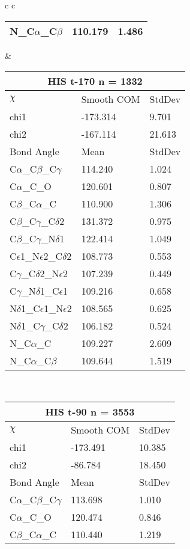 \begin{longtable}{ c c }
\begin{tabular}{ l l l }
  N\_C$\alpha$\_C$\beta$ & 110.179 & 1.486\\
  \bottomrule
  \end{tabular}
  &
  \begin{tabular}{ l l l }
  \toprule
  \multicolumn{3}{c}{HIS \textbf{t-170} n = 1332} \\ \toprule
  $\chi$       & Smooth COM & StdDev \\ \midrule
  chi1 & -173.314 & 9.701 \\ 
  chi2 & -167.114 & 21.613 \\ \midrule
  Bond Angle   & Mean     & StdDev \\ \midrule
  C$\alpha$\_C$\beta$\_C$\gamma$ & 114.240 & 1.024\\
  C$\alpha$\_C\_O & 120.601 & 0.807\\
  C$\beta$\_C$\alpha$\_C & 110.900 & 1.306\\
  C$\beta$\_C$\gamma$\_C$\delta$2 & 131.372 & 0.975\\
  C$\beta$\_C$\gamma$\_N$\delta$1 & 122.414 & 1.049\\
  C$\epsilon$1\_N$\epsilon$2\_C$\delta$2 & 108.773 & 0.553\\
  C$\gamma$\_C$\delta$2\_N$\epsilon$2 & 107.239 & 0.449\\
  C$\gamma$\_N$\delta$1\_C$\epsilon$1 & 109.216 & 0.658\\
  N$\delta$1\_C$\epsilon$1\_N$\epsilon$2 & 108.565 & 0.625\\
  N$\delta$1\_C$\gamma$\_C$\delta$2 & 106.182 & 0.524\\
  N\_C$\alpha$\_C & 109.227 & 2.609\\
  N\_C$\alpha$\_C$\beta$ & 109.644 & 1.519\\
  \bottomrule
  \end{tabular}
  \\
  \begin{tabular}{ l l l }
  \toprule
  \multicolumn{3}{c}{HIS \textbf{t-90} n = 3553} \\ \toprule
  $\chi$       & Smooth COM & StdDev \\ \midrule
  chi1 & -173.491 & 10.385 \\ 
  chi2 & -86.784 & 18.450 \\ \midrule
  Bond Angle   & Mean     & StdDev \\ \midrule
  C$\alpha$\_C$\beta$\_C$\gamma$ & 113.698 & 1.010\\
  C$\alpha$\_C\_O & 120.474 & 0.846\\
  C$\beta$\_C$\alpha$\_C & 110.440 & 1.219\\

\end{tabular}
\end{longtable}
